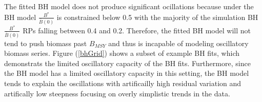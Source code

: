 %
The fitted BH model does not produce significant ocillations because 
under the BH model $\frac{B^*}{\bar B(0)}$ is constrained below 0.5 with the 
majority of the simulation BH $\frac{B^*}{\bar B(0)}$ RPs falling between 0.4 and 0.2. %
Therefore, the fitted BH model will not tend to push biomass past $B_{MSY}$ and 
thus is incapable of modeling oscillatory biomass series. Figure (\ref{bhGrid}) 
shows a subset of example BH fits, which demonstrats the limited oscillatory 
capacity of the BH fits. Furthermore, since the BH model has a limited 
oscillatory capacity in this setting, the BH model tends to explain the 
oscillations with artificailly high residual variation and artifically low 
steepness focusing on overly simplistic trends in the data.
 




